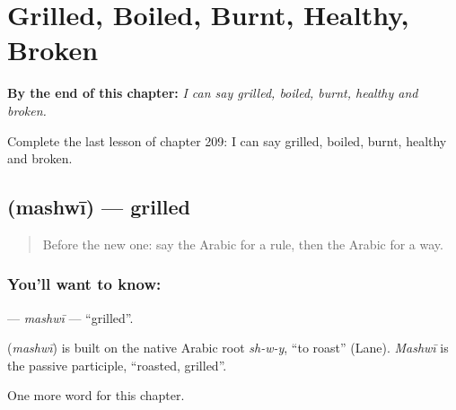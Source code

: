 
\chapter{Grilled, Boiled, Burnt, Healthy, Broken}
\label{ch:ar-grilled-boiled-burnt-healthy-broken}

\begin{chapteropening}
\textbf{By the end of this chapter:} \emph{I can say grilled, boiled, burnt, healthy and broken.}

Complete the last lesson of chapter 209: I can say grilled, boiled, burnt, healthy and broken.
\end{chapteropening}

\section[\texorpdfstring{\ar{مشوي} (mashwī)}{مشوي (mashwī)}]{ (mashwī) — grilled}

\label{lesson:AR-C209-mashwi}



\begin{quote}
Before the new one: say the Arabic for a rule, then the Arabic for a way.
\end{quote}

\subsection*{You'll want to know: }
\textbf{} — \emph{mashwī} — \textquotedblleft{}grilled\textquotedblright{}.

\begin{cousinweb}
\textbf{} (\emph{mashwī}) is built on the native Arabic root \emph{sh-w-y}, \textquotedblleft{}to roast\textquotedblright{} (Lane). \emph{Mashwī} is the passive participle, \textquotedblleft{}roasted, grilled\textquotedblright{}.
\end{cousinweb}

\begin{grammarlens}[title={What you've built}]
One more word for this chapter.
\end{grammarlens}

